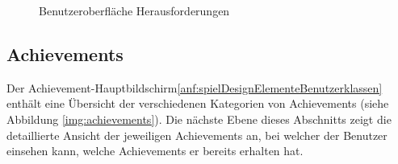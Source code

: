\documentclass[bibliography=totoc,listof=totoc,BCOR=5mm,DIV=12,oneside]{scrbook}
\begin{document}
\bigskip
\begin{figure}[H]
\centering
	\caption{Benutzeroberfläche Herausforderungen}
	\label{img:guide}
\end{figure}

\newpage
\subsection{Achievements}
\par Der Achievement-Hauptbildschirm\ref{anf:spielDesignElementeBenutzerklassen} enthält eine Übersicht der verschiedenen Kategorien von Achievements (siehe Abbildung \ref{img:achievements}). Die nächste Ebene dieses Abschnitts zeigt die detaillierte Ansicht der jeweiligen Achievements an, bei welcher der Benutzer einsehen kann, welche Achievements er bereits erhalten hat. 
\end{document}
